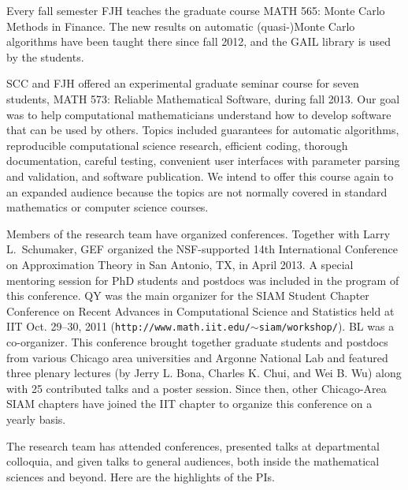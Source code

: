 \documentclass[11pt]{NSFamsart}
\begin{document}
Every fall semester FJH teaches the graduate course MATH 565: Monte Carlo Methods in Finance.  The new results on automatic (quasi-)Monte Carlo algorithms have been taught there since fall 2012, and the GAIL library is used by the students.

SCC and FJH offered an experimental graduate seminar course for seven students, MATH 573: Reliable Mathematical Software, during fall 2013. Our goal was to help computational mathematicians understand how to develop software that can be used by others.  Topics included guarantees for automatic algorithms, reproducible computational science research, efficient coding, thorough documentation, careful testing, convenient user interfaces with parameter parsing and validation, and software publication.  We intend to offer this course again to an expanded audience because the topics are not normally covered in standard mathematics or computer science courses.

Members of the research team have organized conferences. Together with Larry L.~Schumaker, GEF organized the NSF-supported 14th International Conference on Approximation Theory in San Antonio, TX, in April 2013. A special mentoring session for PhD students and postdocs was included in the program of this conference. QY was the main organizer for the SIAM Student Chapter Conference on Recent Advances in Computational Science and Statistics held at IIT Oct. 29--30, 2011 ({\tt http://www.math.iit.edu/$\sim$siam/workshop/}). BL was a co-organizer. This conference brought together graduate students and postdocs from various Chicago area universities and Argonne National Lab and featured three plenary lectures (by Jerry L. Bona, Charles K. Chui, and Wei B. Wu) along with 25 contributed talks and a poster session. Since then, other Chicago-Area SIAM chapters have joined the IIT chapter to organize this conference on a yearly basis.

The research team has attended conferences, presented talks at departmental colloquia, and given talks to general audiences, both inside the mathematical sciences and beyond. Here are the highlights of the PIs.
\end{document}
